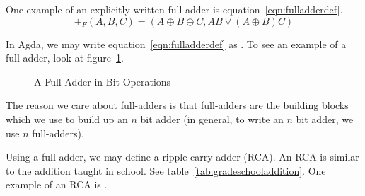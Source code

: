 \documentclass[14pt]{extarticle}  %
\begin{document}
One example of an explicitly written full-adder is equation~\ref{eqn:fulladderdef}.
\begin{equation}\label{eqn:fulladderdef}
  +_{F}(A,B,C) = (A \oplus B \oplus C , AB \lor (A \oplus B)C )
\end{equation}


In Agda, we may write equation~\ref{eqn:fulladderdef} as  .
To see an example of a full-adder, look at figure~\ref{fig:fulladder}.
 \begin{figure}
   \centering
   \caption{A Full Adder in Bit Operations}
   \label{fig:fulladder}
\end{figure}



The reason we care about full-adders is that full-adders are the building blocks which we use to build up an $n$ bit adder (in general, to write an $n$ bit adder, we use $n$ full-adders).

Using a full-adder, we may define a ripple-carry adder (RCA). An RCA is similar to the addition taught in school. See table~\ref{tab:gradeschooladdition}. One example of an RCA is .
\end{document}
